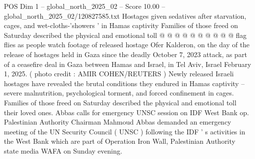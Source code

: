 \begin{textsample}{POS Dim 1 – global\_north\_2025\_02 – Score 10.00 – global\_north\_2025\_02/120827585.txt}
Hostages given sedatives after starvation, cages, and wet-cloths-'showers ' in Hamas captivity Families of those freed on Saturday described the physical and emotional toll @ @ @ @ @ @ @ @ @ @ flag flies as people watch footage of released hostage Ofer Kalderon, on the day of the release of hostages held in Gaza since the deadly October 7, 2023 attack, as part of a ceasefire deal in Gaza between Hamas and Israel, in Tel Aviv, Israel February 1, 2025. ( photo credit : AMIR COHEN/REUTERS ) Newly released Israeli hostages have revealed the brutal conditions they endured in Hamas captivity -- severe malnutrition, psychological torment, and forced confinement in cages.
Families of those freed on Saturday described the physical and emotional toll their loved ones.
Abbas calls for emergency UNSC session on IDF West Bank op.
Palestinian Authority Chairman Mahmoud Abbas demanded an emergency meeting of the UN Security Council ( UNSC ) following the IDF ' s activities in the West Bank which are part of Operation Iron Wall, Palestinian Authority state media WAFA on Sunday evening.

\end{textsample}
